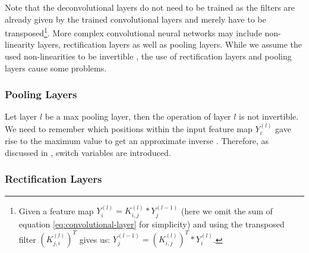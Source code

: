 Note that the deconvolutional layers do not need to be trained as the filters are already given by the trained convolutional layers and merely have to be transposed\footnote{Given a feature map $Y_i^{(l)} = K_{i,j}^{(l)} \ast Y_j^{(l-1)}$ (here we omit the sum of equation \eqref{eq:convolutional-layer} for simplicity) and using the transposed filter $\left(K_{j,i}^{(l)}\right)^T$ gives us: $Y_j^{(l-1)} = \left(K_{i,j}^{(l)}\right)^T \ast Y_i^{(l)}$.}. More complex convolutional neural networks may include non-linearity layers, rectification layers as well as pooling layers. While we assume the used non-linearities to be invertible , the use of rectification layers and pooling layers cause some problems.

\subsubsection{Pooling Layers}

Let layer $l$ be a max pooling layer, then the operation of layer $l$ is not invertible. We need to remember which positions within the input feature map $Y_i^{(l)}$ gave rise to the maximum value to get an approximate inverse \cite{ZeilerFergus:2013}. Therefore, as discussed in \cite{ZeilerFergus:2013}, switch variables are introduced.

\subsubsection{Rectification Layers}

